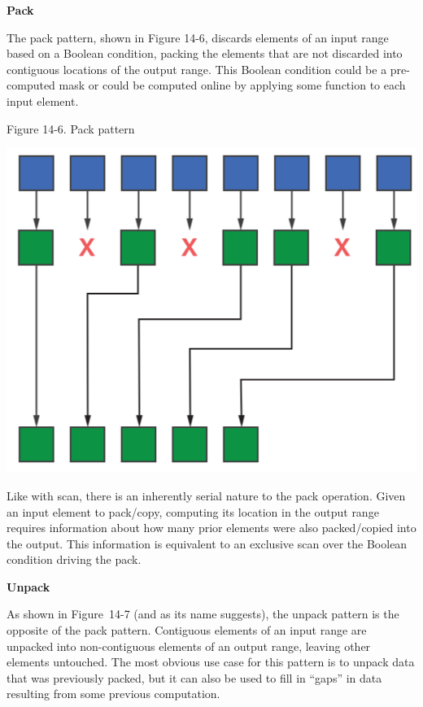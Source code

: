 \hspace*{\fill} \par %
\textbf{Pack}

The pack pattern, shown in Figure 14-6, discards elements of an input range based on a Boolean condition, packing the elements that are not discarded into contiguous locations of the output range. This Boolean condition could be a pre-computed mask or could be computed online by applying some function to each input element.\par

\hspace*{\fill} \par %
Figure 14-6. Pack pattern
\begin{center}
	\includegraphics[width=1.\textwidth]{content/chapter-14/images/6}
\end{center}

Like with scan, there is an inherently serial nature to the pack operation. Given an input element to pack/copy, computing its location in the output range requires information about how many prior elements were also packed/copied into the output. This information is equivalent to an exclusive scan over the Boolean condition driving the pack.\par

\hspace*{\fill} \par %
\textbf{Unpack}

As shown in Figure 14-7 (and as its name suggests), the unpack pattern is the opposite of the pack pattern. Contiguous elements of an input range are unpacked into non-contiguous elements of an output range, leaving other elements untouched. The most obvious use case for this pattern is to unpack data that was previously packed, but it can also be used to fill in “gaps” in data resulting from some previous computation.\par


